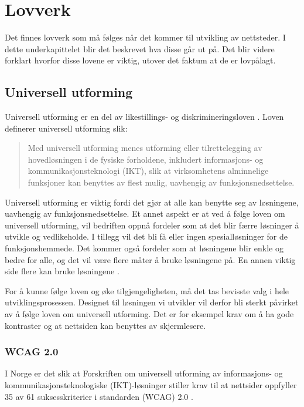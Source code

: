 \section{Lovverk}
Det finnes lovverk som må følges når det kommer til utvikling av nettsteder. I dette underkapittelet blir det beskrevet hva disse går ut på. Det blir videre forklart hvorfor disse lovene er viktig, utover det faktum at de er lovpålagt. 

\subsection{Universell utforming}
\label{sec:universal-design}
Universell utforming er en del av likestillings- og diskrimineringsloven \cite{lovdata2018fou}. Loven definerer universell utforming slik:

\begin{quote}
    Med universell utforming menes utforming eller tilrettelegging av hovedløsningen i de fysiske forholdene, inkludert informasjons- og kommunikasjonsteknologi (IKT), slik at virksomhetens alminnelige funksjoner kan benyttes av flest mulig, uavhengig av funksjonsnedsettelse.
\end{quote}

Universell utforming er viktig fordi det gjør at alle kan benytte seg av løsningene, uavhengig av funksjonsnedsettelse. Et annet aspekt er at ved å følge loven om universell utforming, vil bedriften oppnå fordeler som at det blir færre løsninger å utvikle og vedlikeholde. I tillegg vil det bli få eller ingen spesialløsninger for de funksjonshemmede. Det kommer også fordeler som at løsningene blir enkle og bedre for alle, og det vil være flere måter å bruke løsningene på. En annen viktig side flere kan bruke løsningene \cite{difi2018keu}.

For å kunne følge loven og øke tilgjengeligheten, må det tas bevisste valg i hele utviklingsprosessen. Designet til løsningen vi utvikler vil derfor bli sterkt påvirket av å følge loven om universell utforming. Det er for eksempel krav om å ha gode kontraster og at nettsiden kan benyttes av skjermlesere. 


\subsubsection{WCAG 2.0}

I Norge er det slik at Forskriften om universell utforming av informasjons- og kommunikasjonsteknologiske (IKT)-løsninger \cite{lovdata2013fou} stiller krav til at nettsider oppfyller 35 av 61 suksesskriterier i standarden  (WCAG) 2.0 \cite{difi2018wca}. 

